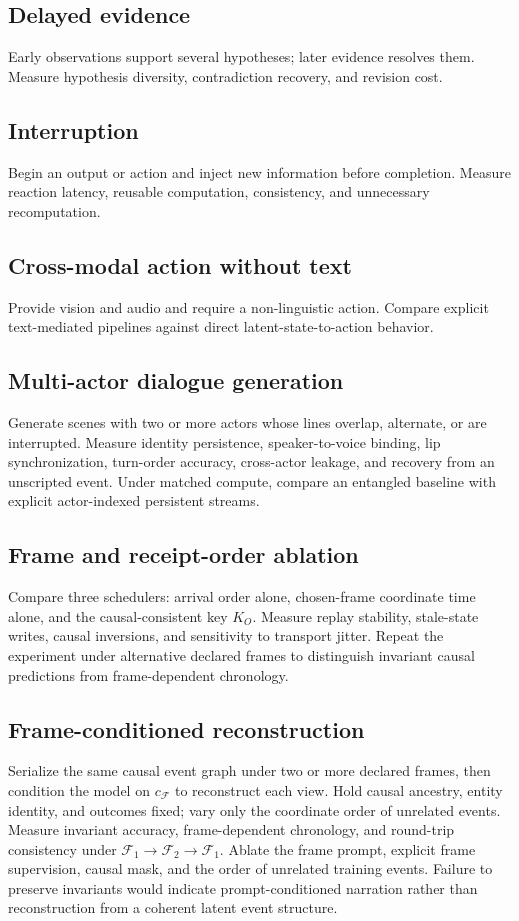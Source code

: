 \documentclass[10pt,twocolumn]{article}
\begin{document}
\subsection{Delayed evidence}
Early observations support several hypotheses; later evidence resolves them. Measure hypothesis diversity, contradiction recovery, and revision cost.

\subsection{Interruption}
Begin an output or action and inject new information before completion. Measure reaction latency, reusable computation, consistency, and unnecessary recomputation.

\subsection{Cross-modal action without text}
Provide vision and audio and require a non-linguistic action. Compare explicit text-mediated pipelines against direct latent-state-to-action behavior.

\subsection{Multi-actor dialogue generation}
Generate scenes with two or more actors whose lines overlap, alternate, or are interrupted. Measure identity persistence, speaker-to-voice binding, lip synchronization, turn-order accuracy, cross-actor leakage, and recovery from an unscripted event. Under matched compute, compare an entangled baseline with explicit actor-indexed persistent streams.

\subsection{Frame and receipt-order ablation}
Compare three schedulers: arrival order alone, chosen-frame coordinate time alone, and the causal-consistent key $K_O$. Measure replay stability, stale-state writes, causal inversions, and sensitivity to transport jitter. Repeat the experiment under alternative declared frames to distinguish invariant causal predictions from frame-dependent chronology.

\subsection{Frame-conditioned reconstruction}
Serialize the same causal event graph under two or more declared frames, then condition the model on $c_{\mathcal F}$ to reconstruct each view. Hold causal ancestry, entity identity, and outcomes fixed; vary only the coordinate order of unrelated events. Measure invariant accuracy, frame-dependent chronology, and round-trip consistency under $\mathcal F_1 \rightarrow \mathcal F_2 \rightarrow \mathcal F_1$. Ablate the frame prompt, explicit frame supervision, causal mask, and the order of unrelated training events. Failure to preserve invariants would indicate prompt-conditioned narration rather than reconstruction from a coherent latent event structure.
\end{document}
